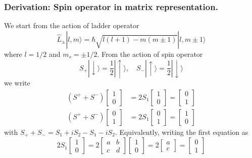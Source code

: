 \documentclass[../../../main.tex]{subfiles}
\begin{document}
\subsubsection{Derivation: Spin operator in matrix representation.}
We start from the action of ladder operator
\begin{equation*}
    \hat{L}_{\pm}   |l, m\rangle = \hbar \sqrt{l(l+1) - m(m \pm 1)}   |l, m \pm 1\rangle
\end{equation*}
where $l=1/2$ and $m_s=\pm1/2$.
From the action of spin operator
\begin{equation*}
    S_+ |\downarrow\rangle = \frac{1 }{2 } |\uparrow\rangle, \quad S_- |\uparrow\rangle = \frac{1 }{2} |\downarrow\rangle
\end{equation*}
we write
\begin{align*}
    (S^+ + S^-) \begin{bmatrix}1 \\ 0 \end{bmatrix} & =  2 S_1 \begin{bmatrix}1 \\ 0 \end{bmatrix} = \begin{bmatrix}0 \\ 1 \end{bmatrix} \\
    (S^+ + S^-) \begin{bmatrix}0 \\ 1 \end{bmatrix} & =  2 S_1 \begin{bmatrix}0 \\ 1 \end{bmatrix} = \begin{bmatrix}1 \\ 0 \end{bmatrix}
\end{align*}
with $S_++S_-=S_1+iS_2-S_1-iS_2$.
Equivalently, writing the first equation as
\begin{equation*}
    2S_1 \begin{bmatrix}
        1 \\
        0
    \end{bmatrix}  =
    2
    \begin{bmatrix}
        a & b \\
        c & d
    \end{bmatrix}  \begin{bmatrix}
        1 \\
        0
    \end{bmatrix}  =
    2
    \begin{bmatrix}
        a \\
        c
    \end{bmatrix}
    =
    \begin{bmatrix}
        0 \\
        1
    \end{bmatrix}
\end{equation*}
\end{document}
